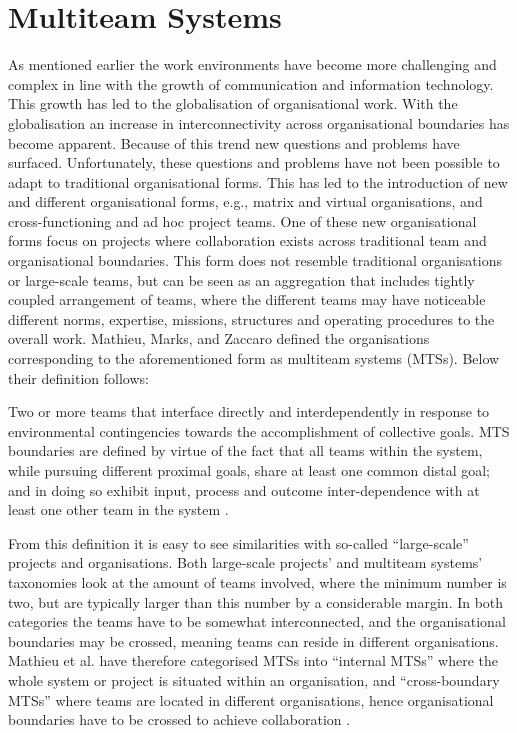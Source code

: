 \section{Multiteam Systems}
As mentioned earlier the work environments have become more challenging and complex in line with the growth of communication and information technology. This growth has led to the globalisation of organisational work. With the globalisation an increase in interconnectivity across organisational boundaries has become apparent. Because of this trend new questions and problems have surfaced. Unfortunately, these questions and problems have not been possible to adapt to traditional organisational forms. This has led to the introduction of new and different organisational forms, e.g., matrix and virtual organisations, and cross-functioning and ad hoc project teams. One of these new organisational forms focus on projects where collaboration exists across traditional team and organisational boundaries. This form does not resemble traditional organisations or large-scale teams, but can be seen as an aggregation that includes tightly coupled arrangement of teams, where the different teams may have noticeable different norms, expertise, missions, structures and operating procedures to the overall work. Mathieu, Marks, and Zaccaro \cite{TODO} defined the organisations corresponding to the aforementioned form as multiteam systems (MTSs). Below their definition follows:

\begin{fancyquotes}
Two or more teams that interface directly and interdependently in response to environmental contingencies towards the accomplishment of collective goals. MTS boundaries are defined by virtue of the fact that all teams within the system, while pursuing different proximal goals, share at least one common distal goal; and in doing so exhibit input, process and outcome inter-dependence with at least one other team in the system \cite{TODO}.
\end{fancyquotes}

From this definition it is easy to see similarities with so-called ``large-scale'' projects and organisations. Both large-scale projects' and multiteam systems' taxonomies look at the amount of teams involved, where the minimum number is two, but are typically larger than this number by a considerable margin. In both categories the teams have to be somewhat interconnected, and the organisational boundaries may be crossed, meaning teams can reside in different organisations. Mathieu et al. have therefore categorised MTSs into ``internal MTSs'' where the whole system or project is situated within an organisation, and ``cross-boundary MTSs'' where teams are located in different organisations, hence organisational boundaries have to be crossed to achieve collaboration \cite{TODO}.

